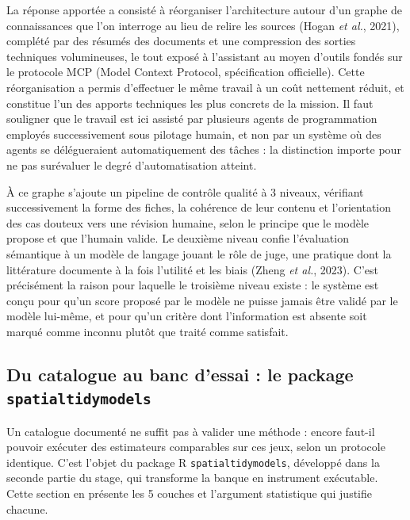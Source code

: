 \documentclass[11pt,a4paper]{article}
\begin{document}
La réponse apportée a consisté à réorganiser l'architecture autour d'un graphe de connaissances que l'on interroge au lieu de relire les sources (Hogan \textit{et al.}, 2021), complété par des résumés des documents et une compression des sorties techniques volumineuses, le tout exposé à l'assistant au moyen d'outils fondés sur le protocole MCP (Model Context Protocol, spécification officielle). Cette réorganisation a permis d'effectuer le même travail à un coût nettement réduit, et constitue l'un des apports techniques les plus concrets de la mission. Il faut souligner que le travail est ici assisté par plusieurs agents de programmation employés successivement sous pilotage humain, et non par un système où des agents se délégueraient automatiquement des tâches : la distinction importe pour ne pas surévaluer le degré d'automatisation atteint.

À ce graphe s'ajoute un pipeline de contrôle qualité à 3 niveaux, vérifiant successivement la forme des fiches, la cohérence de leur contenu et l'orientation des cas douteux vers une révision humaine, selon le principe que le modèle propose et que l'humain valide. Le deuxième niveau confie l'évaluation sémantique à un modèle de langage jouant le rôle de juge, une pratique dont la littérature documente à la fois l'utilité et les biais (Zheng \textit{et al.}, 2023). C'est précisément la raison pour laquelle le troisième niveau existe : le système est conçu pour qu'un score proposé par le modèle ne puisse jamais être validé par le modèle lui-même, et pour qu'un critère dont l'information est absente soit marqué comme inconnu plutôt que traité comme satisfait.

\subsection{Du catalogue au banc d'essai : le package \texttt{spatialtidymodels}}

Un catalogue documenté ne suffit pas à valider une méthode : encore faut-il pouvoir exécuter des estimateurs comparables sur ces jeux, selon un protocole identique. C'est l'objet du package R \texttt{spatialtidymodels}, développé dans la seconde partie du stage, qui transforme la banque en instrument exécutable. Cette section en présente les 5 couches et l'argument statistique qui justifie chacune.
\end{document}
